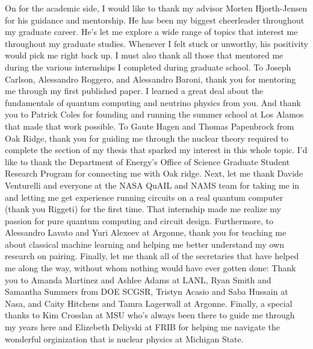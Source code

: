 \documentclass[10pt]{article}
\begin{document}
\quad On for the academic side, I would like to thank my advisor Morten Hjorth-Jensen for his guidance and mentorship. He has been my biggest cheerleader throughout my graduate career. He's let me explore a wide range of topics that interest me throughout my graduate studies. Whenever I felt stuck or unworthy, his positivity would pick me right back up. I must also thank all those that mentored me during the various internships I completed during graduate school. To Joseph Carlson, Alessandro Roggero, and Alessandro Baroni, thank you for mentoring me through my first published paper. I learned a great deal about the fundamentals of quantum computing and neutrino physics from you. And thank you to Patrick Coles for founding and running the summer school at Los Alamos that made that work possible. To Gaute Hagen and Thomas Papenbrock from Oak Ridge, thank you for guiding me through the nuclear theory required to complete the section of my thesis that sparked my interest in this whole topic. I'd like to thank the Department of Energy's Office of Science Graduate Student Research Program for connecting me with Oak ridge. Next, let me thank Davide Venturelli and everyone at the NASA QuAIL and NAMS team for taking me in and letting me get experience running circuits on a real quantum computer (thank you Riggeti) for the first time. That internship made me realize my passion for pure quantum computing and circuit design. Furthermore, to Alessandro Lavato and Yuri Alexeev at Argonne, thank you for teaching me about classical machine learning and helping me better understand my own research on pairing. Finally, let me thank all of the secretaries that have helped me along the way, without whom nothing would have ever gotten done: Thank you to Amanda Martinez and Ashlee Adams at LANL, Ryan Smith and Samantha Summers from DOE SCGSR, Tristyn Acasio and Saba Hussain at Nasa, and Caity Hitchens and Tamra Lagerwall at Argonne. Finally, a special thanks to  Kim Crosslan at MSU who's always been there to guide me through my years here and Elizebeth Deliyski at FRIB for helping me navigate the wonderful orginization that is nuclear physics at Michigan State.

\clearpage
\SingleSpacing
\tableofcontents* %
\clearpage
\clearpage
\listoffigures %
%
%
\mainmatter
%
\end{document}
